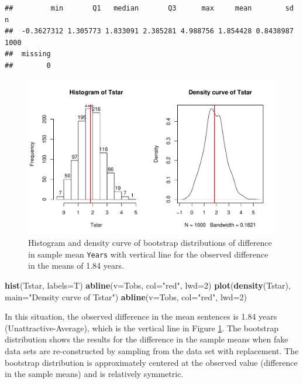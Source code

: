 \documentclass[]{book}
\newenvironment{Shaded}{\begin{snugshade}}{\end{snugshade}}
\newcommand{\KeywordTok}[1]{\textcolor[rgb]{0.13,0.29,0.53}{\textbf{#1}}}
\newcommand{\DataTypeTok}[1]{\textcolor[rgb]{0.13,0.29,0.53}{#1}}
\newcommand{\DecValTok}[1]{\textcolor[rgb]{0.00,0.00,0.81}{#1}}
\newcommand{\StringTok}[1]{\textcolor[rgb]{0.31,0.60,0.02}{#1}}
\newcommand{\NormalTok}[1]{#1}
\theoremstyle{definition}
\theoremstyle{definition}
\theoremstyle{remark}
\begin{document}
\begin{verbatim}
##         min       Q1   median       Q3      max     mean        sd    n
##  -0.3627312 1.305773 1.833091 2.385281 4.988756 1.854428 0.8438987 1000
##  missing
##        0
\end{verbatim}





\begin{figure}
\centering
\includegraphics{02-reintroductionToStatistics_files/figure-latex/Figure2-18-1.pdf}
\caption{\label{fig:Figure2-18}Histogram and density curve of bootstrap distributions of
difference in sample mean \texttt{Years} with vertical line for the
observed difference in the means of 1.84 years.}
\end{figure}

\begin{Shaded}
\begin{Highlighting}[]
\KeywordTok{hist}\NormalTok{(Tstar, }\DataTypeTok{labels=}\NormalTok{T)}
\KeywordTok{abline}\NormalTok{(}\DataTypeTok{v=}\NormalTok{Tobs, }\DataTypeTok{col=}\StringTok{"red"}\NormalTok{, }\DataTypeTok{lwd=}\DecValTok{2}\NormalTok{)}
\KeywordTok{plot}\NormalTok{(}\KeywordTok{density}\NormalTok{(Tstar), }\DataTypeTok{main=}\StringTok{"Density curve of Tstar"}\NormalTok{)}
\KeywordTok{abline}\NormalTok{(}\DataTypeTok{v=}\NormalTok{Tobs, }\DataTypeTok{col=}\StringTok{"red"}\NormalTok{, }\DataTypeTok{lwd=}\DecValTok{2}\NormalTok{)}
\end{Highlighting}
\end{Shaded}

In this situation, the observed difference in the mean sentences is 1.84
years (Unattractive-Average), which is the vertical line in Figure
\ref{fig:Figure2-18}. The bootstrap distribution shows the results for
the difference in the sample means when fake data sets are
re-constructed by sampling from the data set with replacement. The
bootstrap distribution is approximately centered at the observed value
(difference in the sample means) and is relatively symmetric.
\end{document}
